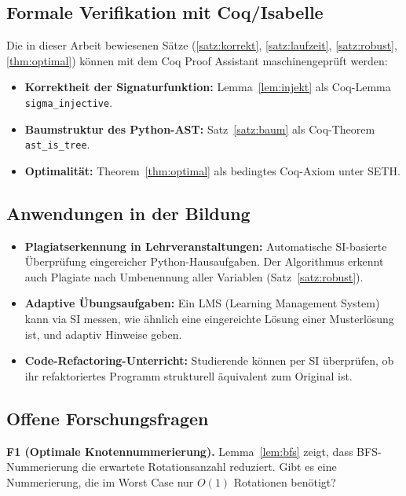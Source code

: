 ﻿\documentclass[a4paper,12pt]{article}
\theoremstyle{definition}
\begin{document}
\subsection{Formale Verifikation mit Coq/Isabelle}

Die in dieser Arbeit bewiesenen S\"atze
(\ref{satz:korrekt}, \ref{satz:laufzeit}, \ref{satz:robust},
\ref{thm:optimal}) k\"onnen mit dem Coq Proof Assistant
\cite{coq2024} maschinengepr\"uft werden:
\begin{itemize}
    \item \textbf{Korrektheit der Signaturfunktion:}
          Lemma~\ref{lem:injekt} als Coq-Lemma
          \texttt{sigma\_injective}.
    \item \textbf{Baumstruktur des Python-AST:}
          Satz~\ref{satz:baum} als Coq-Theorem
          \texttt{ast\_is\_tree}.
    \item \textbf{Optimalit\"at:} Theorem~\ref{thm:optimal}
          als bedingtes Coq-Axiom unter SETH.
\end{itemize}

\subsection{Anwendungen in der Bildung}

\begin{itemize}
    \item \textbf{Plagiatserkennung in Lehrveranstaltungen:}
          Automatische SI-basierte \"Uberpr\"ufung eingereicher
          Python-Hausaufgaben.  Der Algorithmus erkennt auch
          Plagiate nach Umbenennung aller Variablen
          (Satz~\ref{satz:robust}).
    \item \textbf{Adaptive \"Ubungsaufgaben:} Ein LMS
          (Learning Management System) kann via SI messen,
          wie \"ahnlich eine eingereichte L\"osung einer
          Musterl\"osung ist, und adaptiv Hinweise geben.
    \item \textbf{Code-Refactoring-Unterricht:} Studierende
          k\"onnen per SI \"uberpr\"ufen, ob ihr refaktoriertes
          Programm strukturell \"aquivalent zum Original ist.
\end{itemize}

\subsection{Offene Forschungsfragen}

\textbf{F1 (Optimale Knotennummerierung).}
Lemma~\ref{lem:bfs} zeigt, dass BFS-Nummerierung die erwartete
Rotationsanzahl reduziert.  Gibt es eine Nummerierung, die
im Worst Case nur $O(1)$ Rotationen ben\"otigt?
\end{document}
